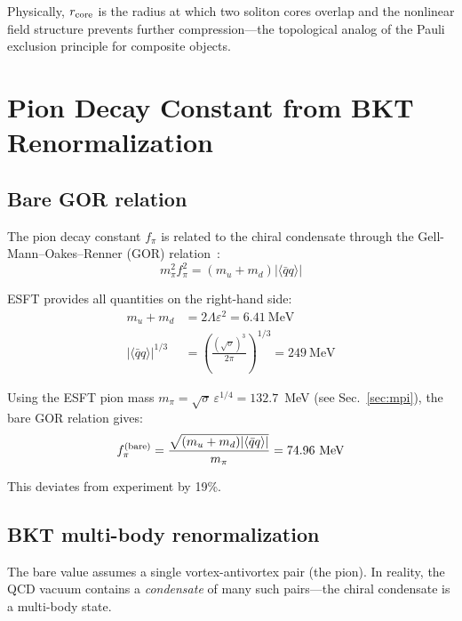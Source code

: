 ﻿\documentclass[twocolumn,showpacs,preprintnumbers,amsmath,amssymb,prc]{revtex4-2}
\begin{document}
Physically, $r_{\rm core}$ is the radius at which two soliton cores overlap and the nonlinear field structure prevents further compression---the topological analog of the Pauli exclusion principle for composite objects.

\section{Pion Decay Constant from BKT Renormalization}
\label{sec:fpi}

\subsection{Bare GOR relation}

The pion decay constant $f_\pi$ is related to the chiral condensate through the Gell-Mann--Oakes--Renner (GOR) relation~\cite{GOR1968}:
\begin{equation}
m_\pi^2 f_\pi^2 = (m_u + m_d)|\langle\bar{q}q\rangle|
\label{eq:GOR}
\end{equation}

ESFT provides all quantities on the right-hand side:
\begin{align}
m_u + m_d &= 2\Lambda\varepsilon^2 = 6.41~\text{MeV} \label{eq:mud} \\
|\langle\bar{q}q\rangle|^{1/3} &= \left(\frac{(\sqrt{\sigma})^3}{2\pi}\right)^{1/3} = 249~\text{MeV} \label{eq:qqbar}
\end{align}

Using the ESFT pion mass $m_\pi = \sqrt{\sigma}\,\varepsilon^{1/4} = 132.7$~MeV (see Sec.~\ref{sec:mpi}), the bare GOR relation gives:
\begin{equation}
f_\pi^{(\rm bare)} = \frac{\sqrt{(m_u+m_d)|\langle\bar{q}q\rangle|}}{m_\pi} = 74.96~\text{MeV}
\label{eq:fpi_bare}
\end{equation}

This deviates from experiment by 19\%.

\subsection{BKT multi-body renormalization}

The bare value assumes a single vortex-antivortex pair (the pion). In reality, the QCD vacuum contains a \emph{condensate} of many such pairs---the chiral condensate is a multi-body state.
\end{document}
